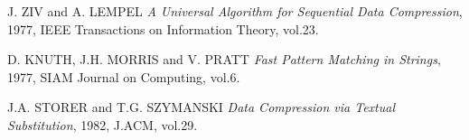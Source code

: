 \begin{thebibliography}{100}

	 J. ZIV and A. LEMPEL {\em A Universal Algorithm for Sequential Data Compression}, 1977, IEEE Transactions on Information Theory, vol.23.
	
	 D. KNUTH, J.H. MORRIS and V. PRATT {\em Fast Pattern Matching in Strings}, 1977, SIAM Journal on Computing, vol.6.
	
	 J.A. STORER and T.G. SZYMANSKI {\em Data Compression via Textual Substitution}, 1982, J.ACM, vol.29.
	
%
%
%	
%
%	
%
%	
%
%
%
%
%
%	
%
%

\end{thebibliography}
